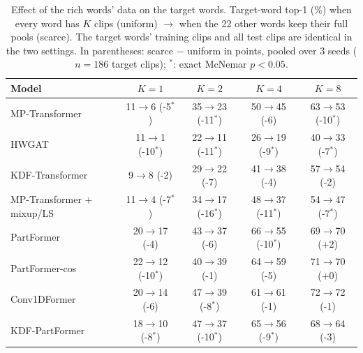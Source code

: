 \begin{table}[t]
\centering
\small
\caption{Effect of the rich words' data on the target words. Target-word top-1 (\%) when every word has $K$ clips (uniform) $\to$ when the 22 other words keep their full pools (scarce). The target words' training clips and all test clips are identical in the two settings. In parentheses: scarce $-$ uniform in points, pooled over 3 seeds ($n=186$ target clips); $^{*}$: exact McNemar $p<0.05$.}
\label{tab:univsscarce}
\begin{tabular}{lcccc}
\toprule
Model & $K=1$ & $K=2$ & $K=4$ & $K=8$ \\
\midrule
MP-Transformer & 11$\to$6 (-5$^{*}$) & 35$\to$23 (-11$^{*}$) & 50$\to$45 (-6) & 63$\to$53 (-10$^{*}$) \\
HWGAT & 11$\to$1 (-10$^{*}$) & 22$\to$11 (-11$^{*}$) & 26$\to$19 (-9$^{*}$) & 40$\to$33 (-7$^{*}$) \\
KDF-Transformer & 9$\to$8 (-2) & 29$\to$22 (-7) & 41$\to$38 (-4) & 57$\to$54 (-2) \\
MP-Transformer + mixup/LS & 11$\to$4 (-7$^{*}$) & 34$\to$17 (-16$^{*}$) & 48$\to$37 (-11$^{*}$) & 54$\to$47 (-7$^{*}$) \\
PartFormer & 20$\to$17 (-4) & 43$\to$37 (-6) & 66$\to$55 (-10$^{*}$) & 69$\to$70 (+2) \\
PartFormer-cos & 22$\to$12 (-10$^{*}$) & 40$\to$39 (-1) & 64$\to$59 (-5) & 71$\to$70 (+0) \\
Conv1DFormer & 20$\to$14 (-6) & 47$\to$39 (-8$^{*}$) & 61$\to$61 (-1) & 72$\to$72 (-1) \\
KDF-PartFormer & 18$\to$10 (-8$^{*}$) & 47$\to$37 (-10$^{*}$) & 65$\to$56 (-9$^{*}$) & 68$\to$64 (-3) \\
\bottomrule
\end{tabular}
\end{table}
